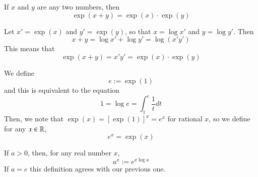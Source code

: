 \documentclass[12pt]{report}
\begin{document}
\begin{subappendices}
    \begin{thm}{}{}
        If $x$ and $y$ are any two numbers, then \begin{equation*}
            \exp(x+y) = \exp(x)\cdot \exp(y)
        \end{equation*}
    \end{thm}
    \begin{proof*}{}{}
        Let $x' = \exp(x)$ and $y' = \exp(y)$, so that $x = \log x'$ and $y = \log y'$. Then \begin{equation*}
            x+y = \log x' + \log y' = \log(x'y')
        \end{equation*}
        This means that \begin{equation*}
            \exp(x+y) = x'y' = \exp(x) \cdot \exp(y)
        \end{equation*}
    \end{proof*}


    \begin{defn}{}{}
        We define \begin{equation}
            e := \exp(1)
        \end{equation}
        and this is equivalent to the equation \begin{equation}
            1 = \log e = \int_1^e\frac{1}{t}dt
        \end{equation}
        Then, we note that $\exp(x) = [\exp(1)]^x = e^x$ for rational $x$, so we define for any $x \in \mathbb R$, \begin{equation}
            e^x =\exp(x)
        \end{equation}
    \end{defn}


    \begin{defn}{}{}
        If $a > 0$, then, for any real number $x$, \begin{equation}
            a^x := e^{x\log a}
        \end{equation}
        If $a = e$ this definition agrees with our previous one.
    \end{defn}



\end{subappendices}
\end{document}
